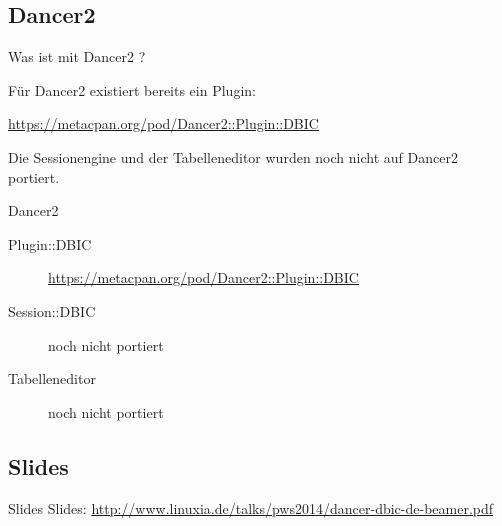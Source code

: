 \subsection{Dancer2}

Was ist mit Dancer2 ?

Für Dancer2 existiert bereits ein Plugin:

\url{https://metacpan.org/pod/Dancer2::Plugin::DBIC}

Die Sessionengine und der Tabelleneditor wurden noch nicht auf Dancer2 portiert.

\begin{frame}{Dancer2}
  \begin{description}
  \item[Plugin::DBIC] \url{https://metacpan.org/pod/Dancer2::Plugin::DBIC}
  \item[Session::DBIC] noch nicht portiert
  \item[Tabelleneditor] noch nicht portiert
  \end{description}
\end{frame}


\subsection{Slides}

\begin{frame}{Slides}
Slides:
\url{http://www.linuxia.de/talks/pws2014/dancer-dbic-de-beamer.pdf}
\end{frame}



